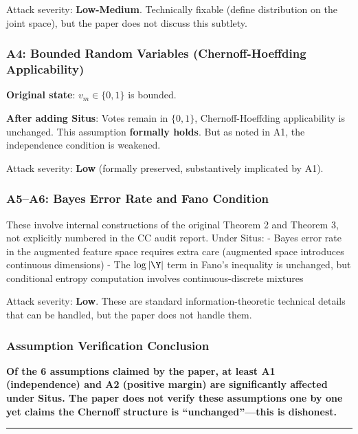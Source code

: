 \documentclass[
  12pt,
]{article}
\begin{document}
Attack severity: \textbf{Low-Medium}. Technically fixable (define distribution on the joint space), but the paper does not discuss this subtlety.

\subsubsection{A4: Bounded Random Variables (Chernoff-Hoeffding Applicability)}\label{a4-bounded-random-variables}

\textbf{Original state}: \(v_m \in \{0,1\}\) is bounded.

\textbf{After adding Situs}: Votes remain in \(\{0,1\}\), Chernoff-Hoeffding applicability is unchanged. This assumption \textbf{formally holds}. But as noted in A1, the independence condition is weakened.

Attack severity: \textbf{Low} (formally preserved, substantively implicated by A1).

\subsubsection{A5--A6: Bayes Error Rate and Fano Condition}\label{a5-a6-bayes-fano}

These involve internal constructions of the original Theorem 2 and Theorem 3, not explicitly numbered in the CC audit report. Under Situs:
- Bayes error rate in the augmented feature space requires extra care (augmented space introduces continuous dimensions)
- The \(\log|\Y|\) term in Fano's inequality is unchanged, but conditional entropy computation involves continuous-discrete mixtures

Attack severity: \textbf{Low}. These are standard information-theoretic technical details that can be handled, but the paper does not handle them.

\subsubsection{Assumption Verification Conclusion}\label{assumption-verification-conclusion}

\textbf{Of the 6 assumptions claimed by the paper, at least A1 (independence) and A2 (positive margin) are significantly affected under Situs. The paper does not verify these assumptions one by one yet claims the Chernoff structure is ``unchanged''---this is dishonest.}

\begin{center}\rule{0.5\linewidth}{0.5pt}\end{center}
\end{document}
